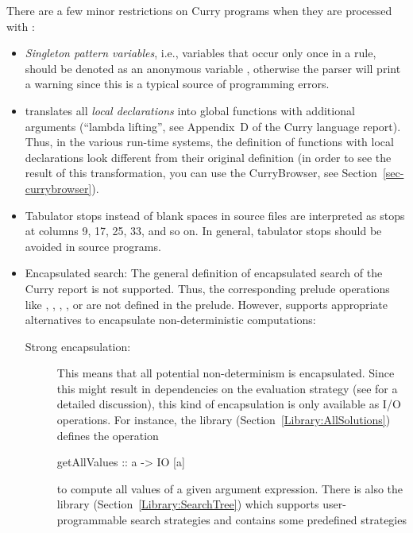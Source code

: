 There are a few minor restrictions on Curry programs
when they are processed with \CYS:
\begin{itemize}
\item
{}
\emph{Singleton pattern variables}, i.e., variables that occur only once
in a rule, should be denoted as an anonymous variable \ccode{_},
otherwise the parser will print a warning since this is a
typical source of programming errors.
\item
\CYS translates all \emph{local declarations} into global functions with
additional arguments (``lambda lifting'', see Appendix~D of the
Curry language report).
Thus, in the various run-time systems, the definition of
functions with local declarations look different from
their original definition (in order to see the result
of this transformation, you can use the CurryBrowser, see
Section~\ref{sec-currybrowser}).
\item {}
Tabulator stops instead of blank spaces in source files are
interpreted as stops at columns 9, 17, 25, 33, and so on.
In general, tabulator stops should be avoided in source programs.
\item
Encapsulated search:
The general definition of encapsulated search of the Curry report
\cite{HanusSteiner98PLILP} is not supported.
Thus, the corresponding prelude operations like
,
,
,
, or
are not defined in the \CYS prelude.
However, \CYS supports appropriate alternatives
to encapsulate non-deterministic computations:
\begin{description}
\item[Strong encapsulation:]
This means that all potential
non-determinism is encapsulated. Since this might
result in dependencies on the evaluation strategy
(see \cite{BrasselHanusHuch04JFLP} for a detailed discussion),
this kind of encapsulation is only available as I/O operations.
For instance, the library 
(Section~\ref{Library:AllSolutions})
defines the operation
\begin{curry}
getAllValues :: a -> IO [a]
\end{curry}
to compute all values of a given argument expression.
There is also the library 
(Section~\ref{Library:SearchTree})
which supports user-programmable search strategies
and contains some predefined strategies

\end{description}
\end{itemize}

